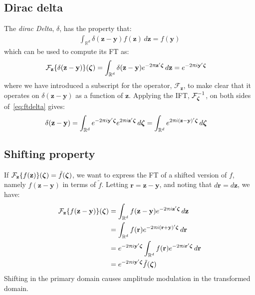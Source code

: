 \documentclass[a4paper,oneside,12pt,english]{report}
\def\zvec{\mathbf{z}}
\def\R{\mathbb{R}}
\def\yvec{\mathbf{y}}
\def\rvec{\mathbf{r}}
\def\Fset{\mathcal{F}}
\newcommand\FT[2][]{\Fset_{#1}\{#2\}}
\begin{document}
\subsection{Dirac delta}
The \emph{dirac Delta}, $\delta$, has the property that:
\begin{align}
\label{eq:delta}
\int_{\R^d} \delta(\zvec-\yvec) f(\zvec) \,d\zvec = f(\yvec) 
\end{align}
which can be used to compute its FT as:
\begin{align}
\label{eq:ftdelta}
\FT[\zvec]{\delta(\zvec-\yvec)}(\zetavec) &= \int_{\R^d} \delta(\zvec-\yvec)e^{-2\uppi\zvec'\zetavec}\,d\zvec
= e^{-2\uppi i\yvec'\zetavec}
\end{align}
where we have introduced a subscript for the operator, $\Fset_\zvec$, to make clear that it operates on $\delta(\zvec-\yvec)$ as a function of $\zvec$. Applying the IFT, $\Fset_{\zetavec}^{-1}$, on both sides of~\eqref{eq:ftdelta} gives:
\begin{align}
\label{eq:iftdelta}
\delta(\zvec-\yvec) &= \int_{\R^d} e^{-2\uppi i\yvec'\zetavec} e^{2\uppi i \zvec'\zetavec} \,d\zetavec
= \int_{\R^d} e^{2\uppi i(\zvec-\yvec)'\zetavec} \,d\zetavec
\end{align}


\subsection{Shifting property}
If $\FT[\zvec]{f(\zvec)}(\zetavec)=\tilde f(\zetavec)$, we want to express the FT of a shifted version of $f$, namely $f(\zvec-\yvec)$ in terms of $\tilde f$. Letting $\rvec=\zvec-\yvec$, and noting that $d\rvec=d\zvec$, we have: 
\begin{align}
\begin{split}
\FT[\zvec]{f(\zvec-\yvec)}(\zetavec) &= \int_{\R^d} f(\zvec-\yvec)e^{-2\uppi i\zvec'\zetavec}\,d\zvec\\
&= \int_{\R^d} f(\rvec)e^{-2\uppi i(\rvec+\yvec)'\zetavec}\,d\rvec \\
&= e^{-2\uppi i\yvec'\zetavec}\int_{\R^d} f(\rvec)e^{-2\uppi i\rvec'\zetavec}\,d\rvec \\
&= e^{-2\uppi i\yvec'\zetavec}\tilde f(\zetavec) \\
\end{split}
\end{align}
Shifting in the primary domain causes amplitude modulation in the transformed domain.
\end{document}
